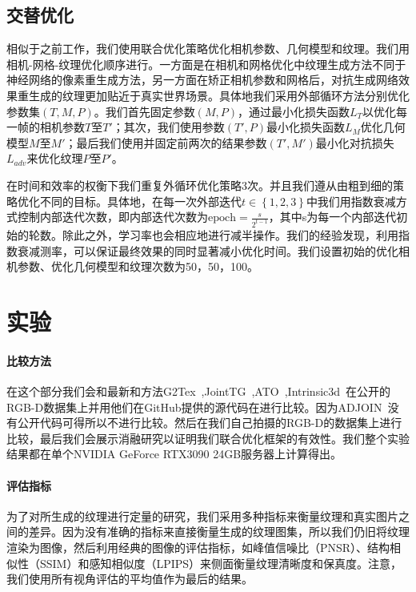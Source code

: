 \subsection{交替优化}
相似于之前工作，我们使用联合优化策略优化相机参数、几何模型和纹理。我们用相机-网格-纹理优化顺序进行。一方面是在相机和网格优化中纹理生成方法不同于神经网络的像素重生成方法，另一方面在矫正相机参数和网格后，对抗生成网络效果重生成的纹理更加贴近于真实世界场景。具体地我们采用外部循环方法分别优化参数集$(T,M,P)$。我们首先固定参数$(M,P)$，通过最小化损失函数$L_T$以优化每一帧的相机参数$T$至$T'$；其次，我们使用参数$(T',P)$最小化损失函数$L_M$优化几何模型$M$至$M'$；最后我们使用并固定前两次的结果参数$(T',M')$最小化对抗损失$L_{adv}$来优化纹理$P$至$P'$。\par
在时间和效率的权衡下我们重复外循环优化策略3次。并且我们遵从由粗到细的策略优化不同的目标。具体地，在每一次外部迭代$t\in \left \{ 1,2,3 \right \}$中我们用指数衰减方式控制内部迭代次数，即内部迭代次数为$\text{epoch}  =\frac{s}{2^{t-1}}$，其中s为每一个内部迭代初始的轮数。除此之外，学习率也会相应地进行减半操作。我们的经验发现，利用指数衰减测率，可以保证最终效果的同时显著减小优化时间。我们设置初始的优化相机参数、优化几何模型和纹理次数为50，50，100。

\section{实验}
\paragraph*{比较方法}
在这个部分我们会和最新和方法G2Tex~\cite{fu2018texture},JointTG~\cite{YanpingFu2020JointTA},ATO~\cite{JingweiHuang2020AdversarialTO},Intrinsic3d~\cite{RobertMaier2017Intrinsic3DH3}在公开的RGB-D数据集上并用他们在GitHub提供的源代码在进行比较。因为ADJOIN~\cite{9705143}没有公开代码可得所以不进行比较。然后在我们自己拍摄的RGB-D的数据集上进行比较，最后我们会展示消融研究以证明我们联合优化框架的有效性。我们整个实验结果都在单个NVIDIA GeForce RTX3090 24GB服务器上计算得出。


\paragraph*{评估指标}
为了对所生成的纹理进行定量的研究，我们采用多种指标来衡量纹理和真实图片之间的差异。因为没有准确的指标来直接衡量生成的纹理图集，所以我们仍旧将纹理渲染为图像，然后利用经典的图像的评估指标，如峰值信噪比（PNSR）、结构相似性（SSIM）和感知相似度（LPIPS）来侧面衡量纹理清晰度和保真度。注意，我们使用所有视角评估的平均值作为最后的结果。
